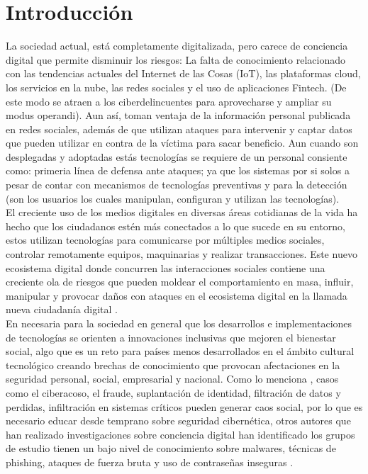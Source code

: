 \chapter{Introducción}\label{cap:capitulo_1}
La sociedad actual, está completamente digitalizada, pero carece de conciencia digital que permite disminuir los riesgos: La falta de conocimiento relacionado con las tendencias actuales del Internet de las Cosas (IoT), las plataformas cloud, los servicios en la nube, las redes sociales y el uso de aplicaciones Fintech. (De este modo se atraen a los ciberdelincuentes para aprovecharse y ampliar su modus operandi). Aun así, toman ventaja de la información personal publicada en redes sociales, además de que utilizan ataques para intervenir y captar datos que pueden utilizar en contra de la víctima para sacar beneficio. Aun cuando son desplegadas y adoptadas estás tecnologías se requiere de un personal consiente como: primeria línea de defensa ante ataques; ya que los sistemas por si solos a pesar de contar con mecanismos de tecnologías preventivas y para la detección (son los usuarios los cuales manipulan, configuran y utilizan las tecnologías). \\

El creciente uso de los medios digitales en diversas áreas cotidianas de la vida ha hecho que los ciudadanos estén más conectados a lo que sucede en su entorno, estos utilizan tecnologías para comunicarse por múltiples medios sociales, controlar remotamente equipos, maquinarias y realizar transacciones. Este nuevo ecosistema digital donde concurren las interacciones sociales contiene una creciente ola de riesgos que pueden moldear el comportamiento en masa, influir, manipular y provocar daños con ataques en el ecosistema digital en la llamada nueva ciudadanía digital \cite{A2020}. \\

En necesaria para la sociedad en general que los desarrollos e implementaciones de tecnologías se orienten a innovaciones inclusivas que mejoren el bienestar social, algo que es un reto para países menos desarrollados en el ámbito cultural tecnológico creando brechas de conocimiento que provocan afectaciones en la seguridad personal, social, empresarial y nacional. Como lo menciona  \cite{Nadeesha2021}, casos como el ciberacoso, el fraude, suplantación de identidad, filtración de datos y perdidas, infiltración en sistemas críticos pueden generar caos social, por lo que es necesario educar desde temprano sobre seguridad cibernética, otros autores que han realizado investigaciones sobre conciencia digital han identificado los grupos de estudio tienen un bajo nivel de conocimiento sobre malwares, técnicas de phishing, ataques de fuerza bruta y uso de contraseñas inseguras \cite{Eslavova2019}. \\

